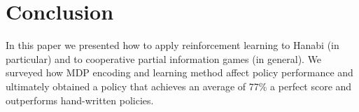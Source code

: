 \section{Conclusion}\label{sec:conclusion}
In this paper we presented how to apply reinforcement learning to Hanabi (in
particular) and to cooperative partial information games (in general). We
surveyed how MDP encoding and learning method affect policy performance and
ultimately obtained a policy that achieves an average of 77\% a perfect score
and outperforms hand-written policies.
